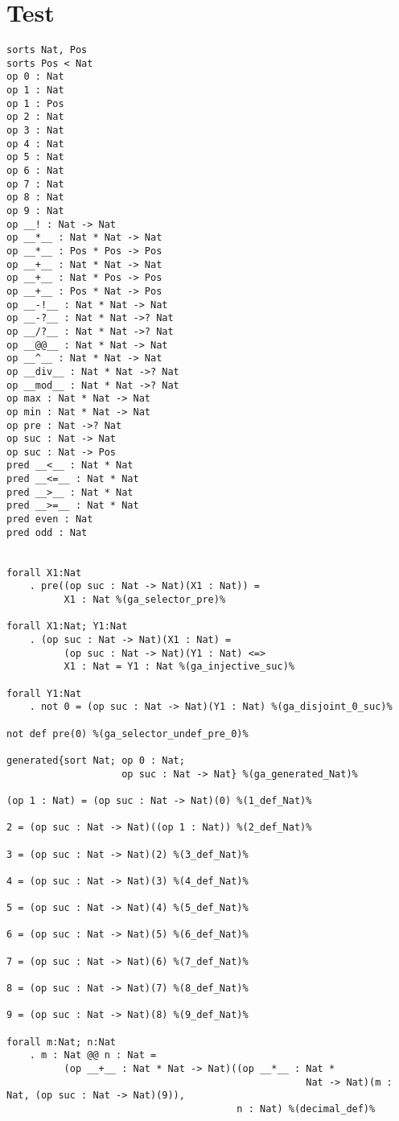 \documentclass[11pt,a4paper]{article}
\begin{document}
\part*{Test}
\begin{verbatim}
sorts Nat, Pos
sorts Pos < Nat
op 0 : Nat
op 1 : Nat
op 1 : Pos
op 2 : Nat
op 3 : Nat
op 4 : Nat
op 5 : Nat
op 6 : Nat
op 7 : Nat
op 8 : Nat
op 9 : Nat
op __! : Nat -> Nat
op __*__ : Nat * Nat -> Nat
op __*__ : Pos * Pos -> Pos
op __+__ : Nat * Nat -> Nat
op __+__ : Nat * Pos -> Pos
op __+__ : Pos * Nat -> Pos
op __-!__ : Nat * Nat -> Nat
op __-?__ : Nat * Nat ->? Nat
op __/?__ : Nat * Nat ->? Nat
op __@@__ : Nat * Nat -> Nat
op __^__ : Nat * Nat -> Nat
op __div__ : Nat * Nat ->? Nat
op __mod__ : Nat * Nat ->? Nat
op max : Nat * Nat -> Nat
op min : Nat * Nat -> Nat
op pre : Nat ->? Nat
op suc : Nat -> Nat
op suc : Nat -> Pos
pred __<__ : Nat * Nat
pred __<=__ : Nat * Nat
pred __>__ : Nat * Nat
pred __>=__ : Nat * Nat
pred even : Nat
pred odd : Nat


forall X1:Nat
    . pre((op suc : Nat -> Nat)(X1 : Nat)) =
          X1 : Nat %(ga_selector_pre)%

forall X1:Nat; Y1:Nat
    . (op suc : Nat -> Nat)(X1 : Nat) =
          (op suc : Nat -> Nat)(Y1 : Nat) <=>
          X1 : Nat = Y1 : Nat %(ga_injective_suc)%

forall Y1:Nat
    . not 0 = (op suc : Nat -> Nat)(Y1 : Nat) %(ga_disjoint_0_suc)%

not def pre(0) %(ga_selector_undef_pre_0)%

generated{sort Nat; op 0 : Nat;
                    op suc : Nat -> Nat} %(ga_generated_Nat)%

(op 1 : Nat) = (op suc : Nat -> Nat)(0) %(1_def_Nat)%

2 = (op suc : Nat -> Nat)((op 1 : Nat)) %(2_def_Nat)%

3 = (op suc : Nat -> Nat)(2) %(3_def_Nat)%

4 = (op suc : Nat -> Nat)(3) %(4_def_Nat)%

5 = (op suc : Nat -> Nat)(4) %(5_def_Nat)%

6 = (op suc : Nat -> Nat)(5) %(6_def_Nat)%

7 = (op suc : Nat -> Nat)(6) %(7_def_Nat)%

8 = (op suc : Nat -> Nat)(7) %(8_def_Nat)%

9 = (op suc : Nat -> Nat)(8) %(9_def_Nat)%

forall m:Nat; n:Nat
    . m : Nat @@ n : Nat =
          (op __+__ : Nat * Nat -> Nat)((op __*__ : Nat *
                                                    Nat -> Nat)(m : Nat, (op suc : Nat -> Nat)(9)),
                                        n : Nat) %(decimal_def)%


\end{verbatim}
\end{document}
